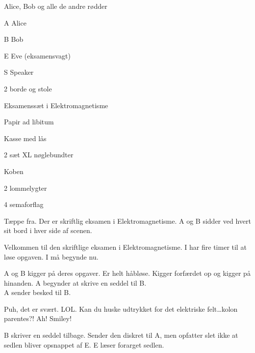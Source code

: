\begin{Sketch}{Alice, Bob og alle de andre rødder}

\begin{Persongalleri}
  \item[A] Alice
  \item[B] Bob
  \item[E] Eve (eksamensvagt)
  \item[S] Speaker
\end{Persongalleri}

\begin{Rekvisitter}
	\item 2 borde og stole
 	\item Eksamenssæt i Elektromagnetisme
	\item Papir ad libitum
	\item Kasse med lås
	\item 2 sæt XL nøglebundter
	\item Koben
	\item 2 lommelygter
	\item 4 semaforflag
\end{Rekvisitter}

\begin{Regi}
  Tæppe fra. Der er skriftlig eksamen i Elektromagnetisme. A og B sidder ved hvert sit bord i hver side af scenen.
\end{Regi}

\begin{Replik}[E]
  Velkommen til den skriftlige eksamen i Elektromagnetisme. I har fire
  timer til at løse opgaven. I må begynde nu.
\end{Replik}

\begin{Regi}
  A og B kigger på deres opgaver. Er helt håbløse. Kigger forfærdet op
  og kigger på hinanden. A begynder at skrive en seddel til B.\\
  A sender besked til B.
\end{Regi}

\begin{Replik}[S]
  Puh, det er svært. LOL. Kan du huske udtrykket for det elektriske
  felt\dots kolon parentes?!  Ah! Smiley!
\end{Replik}

\begin{Regi}
  B skriver en seddel tilbage. Sender den diskret til A, men opfatter
  slet ikke at sedlen bliver opsnappet af E. E læser forarget sedlen.
\end{Regi}


\end{Sketch}
